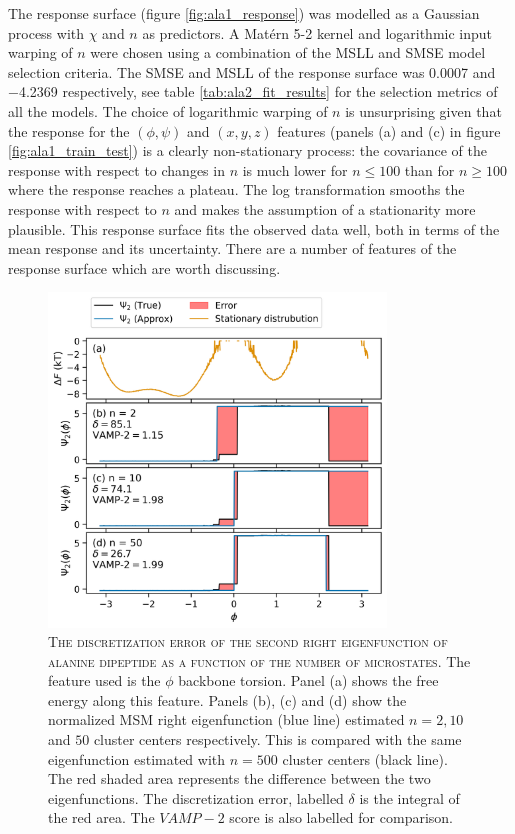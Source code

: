 The response surface (figure \ref{fig:ala1_response}) was modelled as a Gaussian process with $\chi$ and $n$ as predictors. A Mat\'{e}rn 5-2 kernel and logarithmic input warping of $n$ were chosen using a combination of the MSLL and SMSE model selection criteria. The SMSE and MSLL of the response surface was \num{0.0007} and  \num{-4.2369} respectively, see table \ref{tab:ala2_fit_results} for the selection metrics of all the models. The choice of logarithmic warping of $n$ is unsurprising given that the response for the $(\phi, \psi)$ and $(x,y,z)$ features (panels (a) and (c) in figure \ref{fig:ala1_train_test}) is a clearly non-stationary process: the covariance of the response with respect to changes in $n$ is much lower for $n\leq 100$ than for $n\geq 100$ where the response reaches a plateau. The log transformation smooths the response with respect to $n$ and makes the assumption of a stationarity more plausible.  This response surface fits the observed data well, both in terms of the mean response and its uncertainty. There are a number of features of the response surface which are worth discussing. 

\begin{figure}
    \centering
    \caption[The discretization error of the second right eigenfunction of alanine dipeptide as a function of the number of microstates]{\textsc{The discretization error of the second right eigenfunction of alanine dipeptide as a function of the number of microstates}. The feature used is the $\phi$ backbone torsion. Panel (a) shows the free energy along this feature. Panels (b), (c) and (d) show the normalized MSM right eigenfunction (blue line) estimated $n=2, 10$ and $50$ cluster centers respectively. This is compared with the same eigenfunction estimated with $n=500$ cluster centers (black line). The red shaded area represents the difference between the two eigenfunctions. The discretization error, labelled $\delta$ is the integral of the red area. The $VAMP-2$ score is also labelled for comparison.}
    \label{fig:ala1_evcompare}
    \includegraphics[width=0.8\textwidth]{chapters/msm_optimization/figures/ala1_ev_n_compare.png}
\end{figure}

